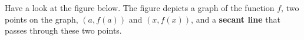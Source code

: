 \documentclass{ximera}
\begin{document}
 Have a look at the figure below.
The figure depicts a graph of the function $f$, two points on the graph, $(a,f(a))$ and $(x,f(x))$, and a \textbf{secant line} that passes  through these two points.
\begin{comment}
\begin{image}
\begin{tikzpicture}
          \begin{axis}[
            clip=false, domain=0:2.5, axis lines =middle, xlabel=$x$,
            ylabel=$y$, every axis y label/.style={at=(current
              axis.above origin),anchor=south}, 
             width=4in,
          ticks=none ]   
                             \addplot [thick, penColor,smooth] {(x-1)^2 };
      
     
                     
           \node at (axis cs:0,-0.1) {$0$};
        
           
               \addplot[only marks,very thick,penColor,mark=*]
	        coordinates{(1.65,0.43)};
	        \addplot[only marks,very thick,penColor,mark=*]
	        coordinates{(2,1)};
            
                \addplot [ thick,penColor3]  plot coordinates {(1.394,0) (2.5,1.825)};
           
	        \addplot[only marks,very thick,penColor,mark=*]
	        coordinates{(2,1)};
               
      \addplot[only marks,penColor,mark=*]
	        coordinates{(2,0)};
            \addplot[only marks,penColor,mark=*]
	        coordinates{(1.65,0)};

               \node at (axis cs:1.65,-0.1) {$a$ };
                \node at (axis cs:1.2,1.8) {slope of the secant line $=\frac{\Delta y}{\Delta x}=\frac{f(x)-f(a)}{x-a}$ };
               \node at (axis cs:2,-0.1) {$x$ };
                 \node at (axis cs:2.3,1) {$(x,f(x))$ };
                  \node at (axis cs:1.4,0.45) {$(a,f(a))$ };
                   \node at (axis cs:2.6,1.5) { secant line  };
        \end{axis}
\end{tikzpicture}
\end{image}
\end{comment}
\end{document}

